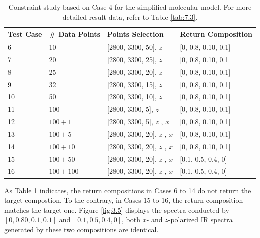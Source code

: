 \begin{table}[ht!] \small
\begin{center}
{\def\arraystretch{1.5}
\begin{tabular}{| p{3cm} | p{3cm} | p{4cm} | l |}
\hline
	Test Case & \# Data Points & Points Selection & Return Composition \\ \hline
	6 & 10 & [2800, 3300, 50], $z$ & [0, 0.8, 0.10, 0.1] \\ \hline
	7 & 20 & [2800, 3300, 25], $z$ & [0, 0.8, 0.10, 0.1 \\ \hline
	8 & 25 & [2800, 3300, 20], $z$ & [0, 0.8, 0.10, 0.1] \\ \hline
	9 & 32 & [2800, 3300, 15], $z$ & [0, 0.8, 0.10, 0.1] \\ \hline
	10 & 50 & [2800, 3300, 10], $z$ & [0, 0.8, 0.10, 0.1] \\ \hline
	11 & 100 & [2800, 3300, 5], $z$ & [0, 0.8, 0.10, 0.1] \\ \hline
	12 & $100 + 1$ & [2800, 3300, 5], $z$ \newline [2800, 3300, 500], $x$ & [0, 0.8, 0.10, 0.1] \\ \hline
	13 & $100 + 5$ & [2800, 3300, 20], $z$ \newline [2800, 3300, 100], $x$ & [0, 0.8, 0.10, 0.1] \\ \hline
	14 & $100 + 10$ & [2800, 3300, 20], $z$ \newline  [2800, 3300, 50], $x$ & [0, 0.8, 0.10, 0.1] \\ \hline
	15 & $100 + 50$ & [2800, 3300, 20], $z$ \newline  [2800, 3300, 10], $x$ & [0.1, 0.5, 0.4, 0] \\ \hline
	16 & $100 + 100$ & [2800, 3300, 20], $z$ \newline  [2800, 3300, 5], $x$ & [0.1, 0.5, 0.4, 0] \\ 
	\hline
\end{tabular} 
}
\end{center}
\caption{Constraint study based on Case 4 for the simplified molecular model. For more detailed result data, refer to Table \ref{tab:7.3}.} \label{tab:3.4}
\end{table}

As Table \ref{tab:3.4} indicates, the return compositions in Cases 6 to 14 do not return the target compostion. To the contrary, in Cases 15 to 16, the return composition matches the target one. Figure \ref{fig:3.5} displays the spectra conducted by $[0, 0.80, 0.1, 0.1]$  and $[0.1, 0.5, 0.4, 0]$, both $x$- and $z$-polarized IR spectra generated by these two compositions are identical.


